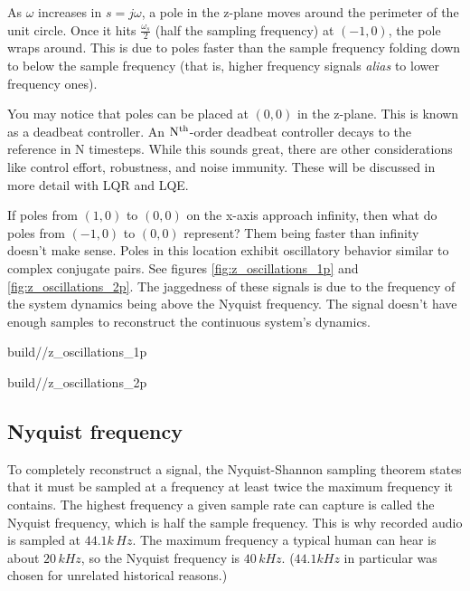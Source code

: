 As $\omega$ increases in $s = j\omega$, a pole in the z-plane moves around the
perimeter of the unit circle. Once it hits $\frac{\omega_s}{2}$ (half the
sampling frequency) at $(-1, 0)$, the pole wraps around. This is due to poles
faster than the sample frequency folding down to below the sample frequency
(that is, higher frequency signals \textit{alias} to lower frequency ones).

You may notice that poles can be placed at $(0, 0)$ in the z-plane. This is
known as a deadbeat controller. An $\rm N^{th}$-order deadbeat controller decays
to the \gls{reference} in N timesteps. While this sounds great, there are other
considerations like \gls{control effort}, \gls{robustness}, and
\gls{noise immunity}. These will be discussed in more detail with LQR and LQE.

If poles from $(1, 0)$ to $(0, 0)$ on the x-axis approach infinity, then what do
poles from $(-1, 0)$ to $(0, 0)$ represent? Them being faster than infinity
doesn't make sense. Poles in this location exhibit oscillatory behavior similar
to complex conjugate pairs. See figures \ref{fig:z_oscillations_1p} and
\ref{fig:z_oscillations_2p}. The jaggedness of these signals is due to the
frequency of the \gls{system} dynamics being above the Nyquist frequency. The
 signal doesn't have enough samples to
reconstruct the continuous \gls{system}'s dynamics.

\begin{bookfigure}
  \begin{minisvg}{2}{build/\chapterpath/z_oscillations_1p}
    \caption{Single poles in various locations in z-plane}
    \label{fig:z_oscillations_1p}
  \end{minisvg}
  \hfill
  \begin{minisvg}{2}{build/\chapterpath/z_oscillations_2p}
    \caption{Complex conjugate poles in various locations in z-plane}
    \label{fig:z_oscillations_2p}
  \end{minisvg}
\end{bookfigure}

\subsection{Nyquist frequency}

To completely reconstruct a signal, the Nyquist-Shannon sampling theorem states
that it must be sampled at a frequency at least twice the maximum frequency it
contains. The highest frequency a given sample rate can capture is called the
Nyquist frequency, which is half the sample frequency. This is why recorded
audio is sampled at $44.1k\,Hz$. The maximum frequency a typical human can hear
is about $20\,kHz$, so the Nyquist frequency is $40\,kHz$. ($44.1kHz$ in
particular was chosen for unrelated historical reasons.)

